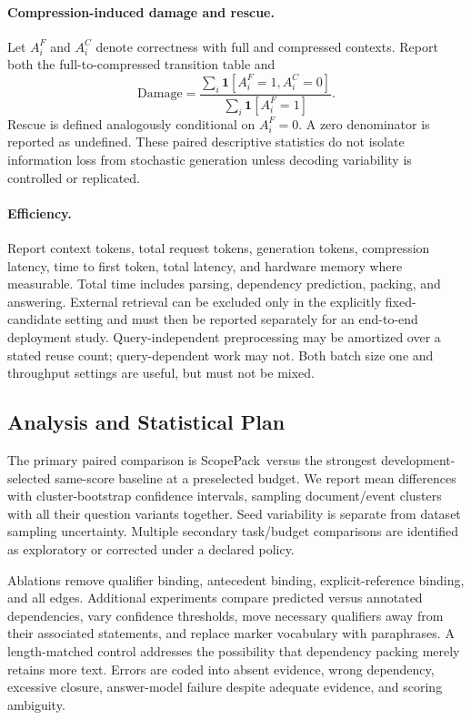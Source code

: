 \documentclass[10pt,twocolumn]{article}
\newcommand{\method}{ScopePack}
\begin{document}
\paragraph{Compression-induced damage and rescue.}
Let $A_i^F$ and $A_i^C$ denote correctness with full and compressed contexts. Report both the full-to-compressed transition table and
\begin{equation}
 \mathrm{Damage}=\frac{\sum_i\mathbf{1}[A_i^F=1,A_i^C=0]}{\sum_i\mathbf{1}[A_i^F=1]}.
\end{equation}
Rescue is defined analogously conditional on $A_i^F=0$. A zero denominator is reported as undefined. These paired descriptive statistics do not isolate information loss from stochastic generation unless decoding variability is controlled or replicated.

\paragraph{Efficiency.}
Report context tokens, total request tokens, generation tokens, compression latency, time to first token, total latency, and hardware memory where measurable. Total time includes parsing, dependency prediction, packing, and answering. External retrieval can be excluded only in the explicitly fixed-candidate setting and must then be reported separately for an end-to-end deployment study. Query-independent preprocessing may be amortized over a stated reuse count; query-dependent work may not. Both batch size one and throughput settings are useful, but must not be mixed.

\subsection{Analysis and Statistical Plan}
The primary paired comparison is \method\ versus the strongest development-selected same-score baseline at a preselected budget. We report mean differences with cluster-bootstrap confidence intervals, sampling document/event clusters with all their question variants together. Seed variability is separate from dataset sampling uncertainty. Multiple secondary task/budget comparisons are identified as exploratory or corrected under a declared policy.

Ablations remove qualifier binding, antecedent binding, explicit-reference binding, and all edges. Additional experiments compare predicted versus annotated dependencies, vary confidence thresholds, move necessary qualifiers away from their associated statements, and replace marker vocabulary with paraphrases. A length-matched control addresses the possibility that dependency packing merely retains more text. Errors are coded into absent evidence, wrong dependency, excessive closure, answer-model failure despite adequate evidence, and scoring ambiguity.
\end{document}
